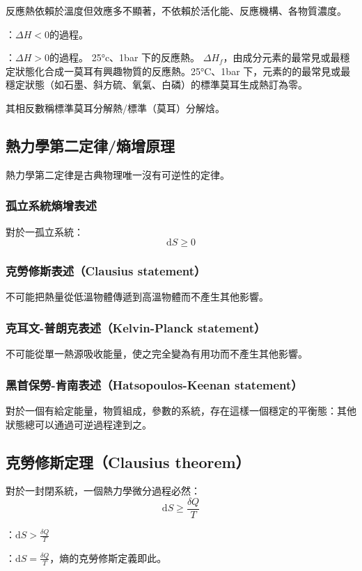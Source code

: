 \documentclass[a4paper,12pt]{report}
\begin{document}
反應熱依賴於溫度但效應多不顯著，不依賴於活化能、反應機構、各物質濃度。

\bit
\item {}：$\Delta H<0$的過程。
\item {}：$\Delta H>0$的過程。
\eit
{}
25°c、1bar 下的反應熱。
$\Delta H_f$，由成分元素的最常見或最穩定狀態化合成一莫耳有興趣物質的反應熱。25°C、1bar 下，元素的的最常見或最穩定狀態（如石墨、斜方硫、氧氣、白磷）的標準莫耳生成熱訂為零。

其相反數稱標準莫耳分解熱/標準（莫耳）分解焓。
\subsection{熱力學第二定律/熵增原理}
熱力學第二定律是古典物理唯一沒有可逆性的定律。
\subsubsection{孤立系統熵增表述}
對於一孤立系統：
\[\mathrm{d}S \geq 0\]
\subsubsection{克勞修斯表述（Clausius statement）}
不可能把熱量從低溫物體傳遞到高溫物體而不產生其他影響。
\subsubsection{克耳文-普朗克表述（Kelvin-Planck statement）}
不可能從單一熱源吸收能量，使之完全變為有用功而不產生其他影響。
\subsubsection{黑首保勞-肯南表述（Hatsopoulos-Keenan statement）}
對於一個有給定能量，物質組成，參數的系統，存在這樣一個穩定的平衡態：其他狀態總可以通過可逆過程達到之。
\subsection{克勞修斯定理（Clausius theorem）}
對於一封閉系統，一個熱力學微分過程必然：
\[\mathrm{d}S \geq \frac{\delta Q}{T}\]
\bit
\item {}：$\mathrm{d}S > \frac{\delta Q}{T}$
\item {}：$\mathrm{d}S = \frac{\delta Q}{T}$，熵的克勞修斯定義即此。
\eit
\end{document}
